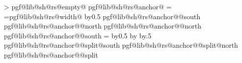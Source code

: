 {{{{            %
            \pgfextract@process{}%
            \addtosavedmacro\centerpoint%
            \pgfmathloop%
                \ifnum\pgfmathcounter>\parts%
                \else%
                    \pgf@lib@sh@getalpha\pgf@lib@sh@rs@number{\pgfmathcounter}%
                    \expandafter\ifx\csname pgf@lib@sh@rs@empty@\pgf@lib@sh@rs@number\endcsname\pgfutil@empty%
                    \else%
                        \csname pgf@lib@sh@rs@anchor@\pgf@lib@sh@rs@number\endcsname%
                        \pgf@xa=\pgf@x%
                        \pgf@xb=\csname pgf@lib@sh@rs@width@\pgf@lib@sh@rs@number\endcsname\relax%
                        \advance\pgf@xa by0.5\pgf@xb%
                        \expandafter\pgfextract@process\csname pgf@lib@sh@rs@anchor@\pgf@lib@sh@rs@number @south\endcsname{%
                            \southwest%
                            \pgf@x=\pgf@xa%
                        }%
                        \expandafter\pgfextract@process\csname pgf@lib@sh@rs@anchor@\pgf@lib@sh@rs@number @north\endcsname{%
                            \northeast%
                            \pgf@x=\pgf@xa%
                        }%
                        \expandafter\addtosavedmacro\csname pgf@lib@sh@rs@anchor@\pgf@lib@sh@rs@number @north\endcsname%
                        \expandafter\addtosavedmacro\csname pgf@lib@sh@rs@anchor@\pgf@lib@sh@rs@number @south\endcsname%
                        \ifnum\pgfmathcounter=\parts%
                        \else%
                            \advance\pgf@xa by0.5\pgf@xb%
                            \advance\pgf@xa by\innerxsep\relax%
                            \advance\pgf@xa by.5\pgflinewidth%
                            \expandafter\pgfextract@process\csname pgf@lib@sh@rs@anchor@\pgf@lib@sh@rs@number @split@south\endcsname{%
                                \southwest%
                                \pgf@x=\pgf@xa%
                            }%
                            \expandafter\pgfextract@process\csname pgf@lib@sh@rs@anchor@\pgf@lib@sh@rs@number @split@north\endcsname{%
                                \northeast%
                                \pgf@x=\pgf@xa%
                            }%
                            \expandafter\pgfextract@process\csname pgf@lib@sh@rs@anchor@\pgf@lib@sh@rs@number @split\endcsname{%
                                \centerpoint%
                                \pgf@x=\pgf@xa%
}}}}}
